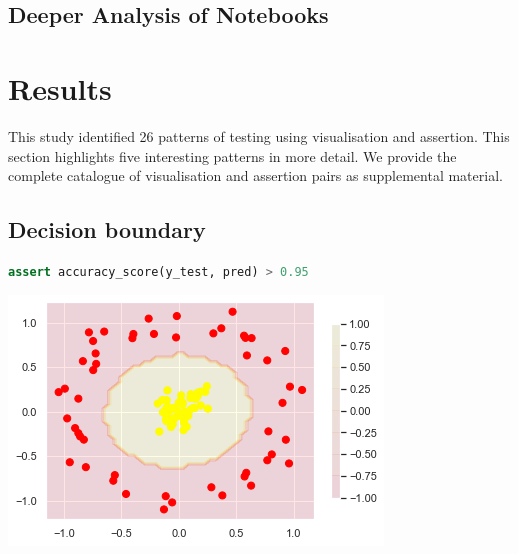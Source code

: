 \documentclass[acmsmall,screen,review,anonymous]{acmart}
\begin{document}
\subsection{Deeper Analysis of Notebooks}\label{sec:deep-dive}

\section{Results}\label{sec:result}
This study identified 26 patterns of testing using visualisation and
assertion. This section highlights five interesting patterns in more
detail. We provide the complete catalogue of visualisation and
assertion pairs as supplemental material.

\subsection{Decision boundary}\label{sec:svm}

\begin{minipage}{0.5\textwidth}
  \begin{lstlisting}[language=Python]
assert accuracy_score(y_test, pred) > 0.95
  \end{lstlisting}
  \label{lst:svm}
\end{minipage}
\begin{minipage}{0.5\textwidth}
  \includegraphics[width=\linewidth]{../catalogue/select-04.png}
  \label{fig:svm}
\end{minipage}
\end{document}
